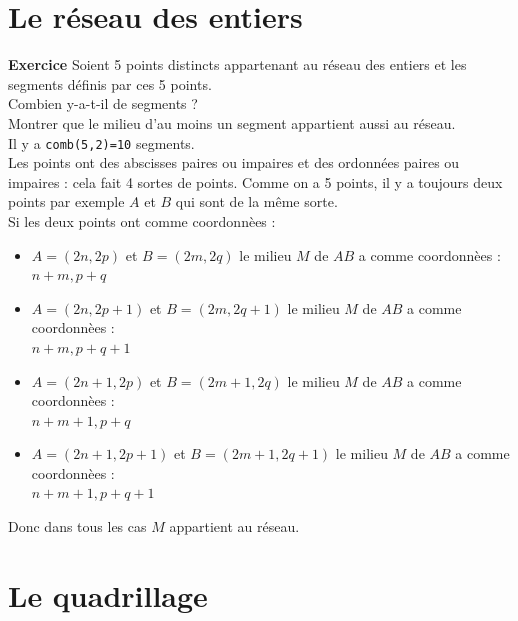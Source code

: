 \documentclass[a4paper,11pt]{book}
\begin{document}
\section{Le r\'eseau des entiers}
{\bf Exercice}
Soient 5 points distincts appartenant au  r\'eseau des entiers et les segments 
d\'efinis par ces 5 points.\\
Combien y-a-t-il de segments ?\\
Montrer que le milieu d'au moins un segment appartient aussi au r\'eseau.\\

Il y a {\tt comb(5,2)=10} segments.\\
Les points ont des abscisses paires ou impaires et des ordonn\'ees paires ou 
impaires  : cela fait 4 sortes de points. Comme on a 5 points, il y a toujours 
deux points par exemple $A$ et $B$ qui sont de la m\^eme sorte.\\
Si les deux points ont comme coordonn\`ees :
\begin{itemize}
\item $A=(2n,2p)$ et $B=(2m,2q)$ le milieu $M$ de $AB$ a comme coordonn\`ees :\\
$n+m,p+q$
\item $A=(2n,2p+1)$ et $B=(2m,2q+1)$ le milieu $M$ de $AB$ a comme 
coordonn\`ees :\\
$n+m,p+q+1$
\item $A=(2n+1,2p)$ et $B=(2m+1,2q)$ le milieu $M$ de $AB$ a comme 
coordonn\`ees :\\
$n+m+1,p+q$
\item $A=(2n+1,2p+1)$ et $B=(2m+1,2q+1)$ le milieu $M$ de $AB$ a comme 
coordonn\`ees :\\
$n+m+1,p+q+1$
\end{itemize}
Donc dans tous les cas $M$ appartient au r\'eseau.
\section{Le quadrillage}
\end{document}
